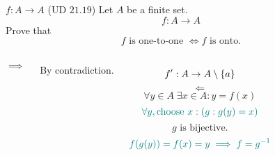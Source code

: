 \begin{frame}{}
  \begin{exampleblock}{$f: A \to A$ (UD $21.19$)}
    Let $A$ be a finite set.
    \[
      f: A \to A
    \]
    Prove that 
    \[
      f \text{ is one-to-one } \iff f \text{ is onto}.
    \]
  \end{exampleblock}

  \pause
  \vspace{0.60cm}
  \begin{columns}
      \[
	\implies
      \]
      \centerline{By contradiction.}
      \pause 
      \[
	f': A \to A \setminus \{a\}
      \]
      \pause
      \[
	\Longleftarrow
      \]
      \pause \vspace{-0.30cm}
      \[
	\forall y \in A\; \exists x \in A: y = f(x)
      \]
      \pause \vspace{-0.30cm}
      \[
	\textcolor{teal}{\forall y, \text{choose $x$}: (g: g(y) = x)}
      \]
      \pause \vspace{-0.30cm}
      \[
	g \text{ is bijective.}
      \]
      \pause \vspace{-0.30cm}
      \[
	\textcolor{teal}{f(g(y)) = f(x) = y \implies f = g^{-1}}
      \]
  \end{columns}
\end{frame}
